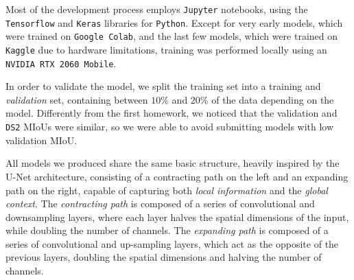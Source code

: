 \documentclass[11pt]{article}
\begin{document}
\begin{multicols}{2}


      Most of the development process employs \texttt{Jupyter} notebooks, using the \texttt{Tensorflow}\cite{TensorFlow} and \texttt{Keras}\cite{chollet2015keras} libraries for \texttt{Python}. Except for very early models, which were trained on \texttt{Google Colab}, and the last few models, which were trained on \texttt{Kaggle} due to hardware limitations, training was performed locally using an \texttt{NVIDIA RTX 2060 Mobile}.

      In order to validate the model, we split the training set into a training and \textit{validation} set, containing between $10\%$ and $20\%$ of the data depending on the model. Differently from the first homework, we noticed that the validation and \texttt{DS2} MIoUs were similar, so we were able to avoid submitting models with low validation MIoU.

      All models we produced share the same basic structure, heavily inspired by the U-Net\cite{ronneberger2015unetconvolutionalnetworksbiomedical} architecture, consisting of a contracting path on the left and an expanding path on the right, capable of capturing both \textit{local information} and the \textit{global context}. The \textit{contracting path} is composed of a series of convolutional and downsampling layers, where each layer halves the spatial dimensions of the input, while doubling the number of channels. The \textit{expanding path} is composed of a series of convolutional and up-sampling layers, which act as the opposite of the previous layers, doubling the spatial dimensions and halving the number of channels. 


\end{multicols}
\end{document}
